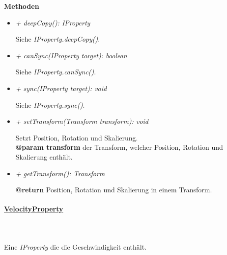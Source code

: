             \textbf{Methoden}
            \begin{itemize}
                \item \textit{+ deepCopy(): IProperty}
                    \begin{leftbar}[0.9\linewidth]
                        Siehe \textit{IProperty.deepCopy()}.
                    \end{leftbar}
                \item \textit{+ canSync(IProperty target): boolean}
                    \begin{leftbar}[0.9\linewidth]
                        Siehe \textit{IProperty.canSync()}.
                    \end{leftbar}
                \item \textit{+ sync(IProperty target): void}
                    \begin{leftbar}[0.9\linewidth]
                        Siehe \textit{IProperty.sync()}.
                    \end{leftbar}
                \item \textit{+ setTransform(Transform transform): void}
                    \begin{leftbar}[0.9\linewidth]
                        Setzt Position, Rotation und Skalierung.\\
                        \textbf{@param transform} der Transform, welcher Position, Rotation und Skalierung enthält.
                    \end{leftbar}

                \pagebreak
                \item \textit{+ getTransform(): Transform}
                    \begin{leftbar}[0.9\linewidth]
                        \textbf{@return} Position, Rotation und Skalierung in einem Transform.
                    \end{leftbar}
            \end{itemize}
            
        \paragraph{\underline{VelocityProperty}} \mbox{}\\
        \\
            Eine \textit{IProperty} die die Geschwindigkeit enthält.\par


